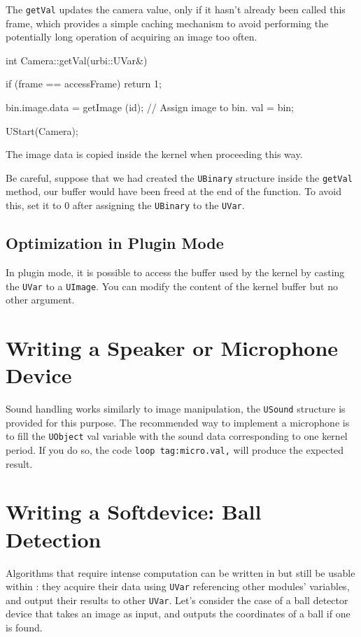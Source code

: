 The \lstinline{getVal} updates the camera value, only if it hasn't
already been called this frame, which provides a simple caching
mechanism to avoid performing the potentially long operation of
acquiring an image too often.

\begin{cxx}
int
Camera::getVal(urbi::UVar&)
{
  if (frame == accessFrame)
    return 1;

  bin.image.data = getImage (id);
  // Assign image to bin.
  val = bin;
}

UStart(Camera);
\end{cxx}

The image data is copied inside the kernel when proceeding this way.

Be careful, suppose that we had created the \lstinline{UBinary}
structure inside the \lstinline{getVal} method, our buffer would have
been freed at the end of the function. To avoid this, set it to 0
after assigning the \lstinline{UBinary} to the \lstinline{UVar}.

\subsection{Optimization in Plugin Mode}

In plugin mode, it is possible to access the buffer used by the kernel
by casting the \lstinline{UVar} to a \lstinline{UImage}. You can
modify the content of the kernel buffer but no other argument.

\section{Writing a Speaker or Microphone Device}

Sound handling works similarly to image manipulation, the
\lstinline{USound} structure is provided for this purpose. The
recommended way to implement a microphone is to fill the
\lstinline{UObject} val variable with the sound data corresponding to
one kernel period. If you do so, the \urbi code
\lstinline{loop tag:micro.val,} will produce the expected result.

\section{Writing a Softdevice: Ball Detection}

Algorithms that require intense computation can be written in \Cxx but
still be usable within \urbi: they acquire their data using
\lstinline{UVar} referencing other modules' variables, and output
their results to other \lstinline{UVar}. Let's consider the case of a
ball detector device that takes an image as input, and outputs the
coordinates of a ball if one is found.


